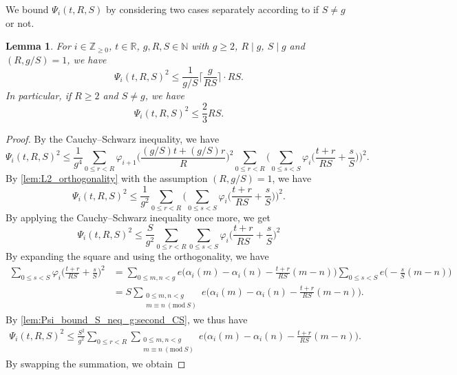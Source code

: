 \documentclass[hidelinks]{amsart}
\numberwithin{equation}{section}
\theoremstyle{plain}
\newtheorem{lemma}{Lemma}
\theoremstyle{definition}
\let\tmp\phi
\let\phi\varphi
\let\varphi\tmp
\let\tmp\epsilon
\let\epsilon\varepsilon
\let\varepsilon\tmp
\renewcommand{\mod}[1]{(\mathrm{mod}\ #1)}
\begin{document}
We bound $\Psi_{i}(t,R,S)$ by considering two cases separately according to if $S\neq g$ or not.
\begin{lemma}
\label{lem:Psi_bound_S_neq_g}
For $i\in\mathbb{Z}_{\ge0}$, $t\in\mathbb{R}$, $g,R,S\in\mathbb{N}$
with $g\ge2$, $R\mid g$, $S\mid g$ and $(R,g/S)=1$, we have
\[
\Psi_{i}(t,R,S)^{2}
\le
\frac{1}{g/S}\biggl\lceil\frac{g}{RS}\biggr\rceil
\cdot
RS.
\]
In particular, if $R\ge2$ and $S\neq g$, we have
\[
\Psi_{i}(t,R,S)^{2}
\le
\frac{2}{3}RS.
\]
\end{lemma}
\begin{proof}
By the Cauchy--Schwarz inequality, we have
\begin{equation}
\label{lem:Psi_bound_S_neq_g:first_CS}
\Psi_{i}(t,R,S)^{2}
\le
\frac{1}{g^{4}}
\sum_{0\le r<R}
\phi_{i+1}\biggl(\frac{(g/S)t+(g/S)r}{R}\biggr)^{2}
\sum_{0\le r<R}
\biggl(
\sum_{0\le s<S}
\phi_{i}\biggl(\frac{t+r}{RS}+\frac{s}{S}\biggr)
\biggr)^{2}.
\end{equation}
By \cref{lem:L2_orthogonality} with the assumption $(R,g/S)=1$, we have
\[
\Psi_{i}(t,R,S)^{2}
\le
\frac{1}{g^{2}}
\sum_{0\le r<R}
\biggl(
\sum_{0\le s<S}
\phi_{i}\biggl(\frac{t+r}{RS}+\frac{s}{S}\biggr)
\biggr)^{2}.
\]
By applying the Cauchy--Schwarz inequality once more, we get
\begin{equation}
\label{lem:Psi_bound_S_neq_g:second_CS}
\Psi_{i}(t,R,S)^{2}
\le
\frac{S}{g^{2}}
\sum_{0\le r<R}
\sum_{0\le s<S}
\phi_{i}\biggl(\frac{t+r}{RS}+\frac{s}{S}\biggr)^{2}
\end{equation}
By expanding the square and using the orthogonality, we have
\begin{align}
\sum_{0\le s<S}
\phi_{i}\biggl(\frac{t+r}{RS}+\frac{s}{S}\biggr)^{2}
&=
\sum_{0\le m,n<g}
e\biggl(\alpha_{i}(m)-\alpha_{i}(n)-\frac{t+r}{RS}(m-n)\biggr)
\sum_{0\le s<S}
e\biggl(-\frac{s}{S}(m-n)\biggr)\\
&=
S
\sum_{\substack{
0\le m,n<g\\
m\equiv n\ \mod{S}
}}
e\biggl(\alpha_{i}(m)-\alpha_{i}(n)-\frac{t+r}{RS}(m-n)\biggr).
\end{align}
By \cref{lem:Psi_bound_S_neq_g:second_CS}, we thus have
\begin{align}
\Psi_{i}(t,R,S)^{2}
\le
\frac{S^{2}}{g^{2}}
\sum_{0\le r<R}
\sum_{\substack{
0\le m,n<g\\
m\equiv n\ \mod{S}
}}
e\biggl(\alpha_{i}(m)-\alpha_{i}(n)-\frac{t+r}{RS}(m-n)\biggr).
\end{align}
By swapping the summation, we obtain

\end{proof}
\end{document}
